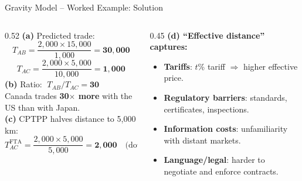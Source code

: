 \documentclass[aspectratio=169]{beamer}
\begin{document}
\begin{frame}{Gravity Model -- Worked Example: Solution}
\begin{columns}[T]
\begin{column}{0.52\textwidth}
\textbf{(a)} Predicted trade:
\[T_{AB} = \frac{2{,}000\times15{,}000}{1{,}000} = \mathbf{30{,}000}\]
\[T_{AC} = \frac{2{,}000\times5{,}000}{10{,}000} = \mathbf{1{,}000}\]
\textbf{(b)} Ratio: $\;T_{AB}/T_{AC} = \mathbf{30}$\\[0.3em]
Canada trades \textbf{30$\times$ more} with the US than with Japan.\\[0.3em]
\textbf{(c)} CPTPP halves distance to 5{,}000 km:
\[T_{AC}^{\text{FTA}} = \frac{2{,}000\times5{,}000}{5{,}000} = \mathbf{2{,}000}\quad\text{(doubled)}\]
\end{column}
\begin{column}{0.45\textwidth}
\textbf{(d) ``Effective distance'' captures:}
\begin{itemize}\small
  \item \textbf{Tariffs}: $t$\% tariff $\Rightarrow$ higher effective price.
  \item \textbf{Regulatory barriers}: standards, certificates, inspections.
  \item \textbf{Information costs}: unfamiliarity with distant markets.
  \item \textbf{Language/legal}: harder to negotiate and enforce contracts.
\end{itemize}

\end{column}
\end{columns}
\end{frame}





\end{document}
